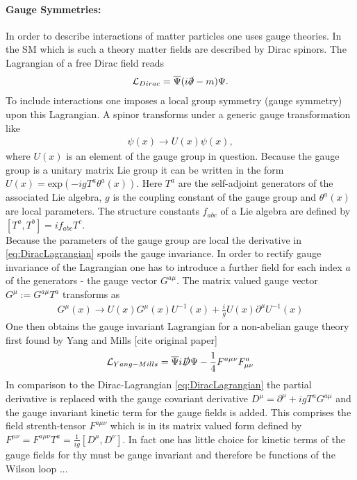 \paragraph{Gauge Symmetries:} In order to describe interactions of matter particles one uses gauge theories. In the SM which is such a theory matter fields are described by Dirac spinors. The Lagrangian of a free Dirac field reads
\begin{align}
\mathcal{L}_{Dirac} = \overline{\Psi} ( i\slashed{\partial} - m)\Psi.\label{eq:DiracLagrangian}
\end{align}
To include interactions one imposes a local group symmetry (gauge symmetry) upon this Lagrangian. A spinor transforms under a generic gauge transformation like 
\begin{align}
\psi(x) \to U(x)\psi(x),
\end{align}
where $U(x)$ is an element of the gauge group in question. Because the gauge group is a unitary matrix Lie group it can be written in the form $U(x)=\mathrm{exp}(-igT^a\theta^a(x))$. Here $T^a$ are the self-adjoint generators of the associated Lie algebra, $g$ is the coupling constant of the gauge group and $\theta^a(x)$ are local parameters. The structure constants $f_{abc}$ of a Lie algebra are defined by $[T^a,T^b] = if_{abc}T^c$.\\
Because the parameters of the gauge group are local the derivative in \ref{eq:DiracLagrangian} spoils the gauge invariance. In order to rectify gauge invariance of the Lagrangian one has to introduce a further field for each index $a$ of the generators - the gauge vector $G^{a\mu}$. The matrix valued gauge vector $G^\mu := G^{a\mu}T^a$ transforms as 
\begin{align}
G^{\mu}(x) \to U(x)G^\mu(x)U^{-1}(x) + \frac{i}{g}U(x)\partial^\mu U^{-1}(x)
\end{align}
One then obtains the gauge invariant Lagrangian for a non-abelian gauge theory first found by Yang and Mills [cite original paper]
\begin{align}
\mathcal{L}_{Yang-Mills} = \overline{\Psi}i\slashed{D}\Psi - \frac{1}{4}F^{a\mu\nu}F^a_{\mu\nu}
\end{align}
In comparison to the Dirac-Lagrangian \ref{eq:DiracLagrangian} the partial derivative is replaced with the gauge covariant derivative $D^\mu = \partial^\mu + igT^aG^{a\mu}$ and the gauge invariant kinetic term for the gauge fields is added. This comprises the field strenth-tensor $F^{a\mu\nu}$ which is in its matrix valued form defined by $F^{\mu\nu} = F^{a\mu\nu}T^a = \frac{1}{ig}[D^\mu,D^\nu]$. In fact one has little choice for kinetic terms of the gauge fields for thy must be gauge invariant and therefore be functions of the Wilson loop \cite{Peskin}...\\
